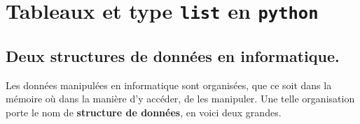 %
%  
%
%  
%
%  
%
%  
%
%
%  
%
%
%  
%
%  
%
%  


\section{Tableaux et type \texttt{list} en \texttt{python}}

\subsection{Deux structures de données en informatique.}

Les données manipulées en informatique sont organisées, que ce soit dans la mémoire où dans la manière d'y accéder, de les manipuler. 
Une telle organisation porte le nom de \textbf{structure de données}, en voici deux grandes.  

